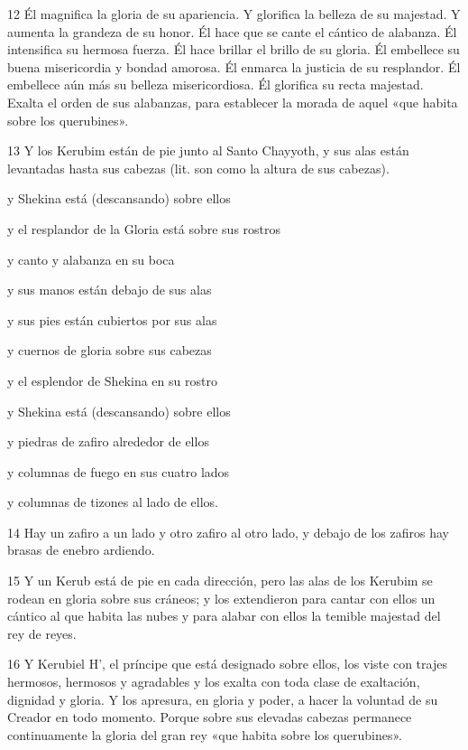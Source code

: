 \par 12 Él magnifica la gloria de su apariencia. Y glorifica la belleza de su majestad. Y aumenta la grandeza de su honor. Él hace que se cante el cántico de alabanza. Él intensifica su hermosa fuerza. Él hace brillar el brillo de su gloria. Él embellece su buena misericordia y bondad amorosa. Él enmarca la justicia de su resplandor. Él embellece aún más su belleza misericordiosa. Él glorifica su recta majestad. Exalta el orden de sus alabanzas, para establecer la morada de aquel «que habita sobre los querubines».

\par 13 Y los Kerubim están de pie junto al Santo Chayyoth, y sus alas están levantadas hasta sus cabezas (lit. son como la altura de sus cabezas).
\par y Shekina está (descansando) sobre ellos
\par y el resplandor de la Gloria está sobre sus rostros
\par y canto y alabanza en su boca
\par y sus manos están debajo de sus alas
\par y sus pies están cubiertos por sus alas
\par y cuernos de gloria sobre sus cabezas
\par y el esplendor de Shekina en su rostro
\par y Shekina está (descansando) sobre ellos
\par y piedras de zafiro alrededor de ellos
\par y columnas de fuego en sus cuatro lados
\par y columnas de tizones al lado de ellos.

\par 14 Hay un zafiro a un lado y otro zafiro al otro lado, y debajo de los zafiros hay brasas de enebro ardiendo.

\par 15 Y un Kerub está de pie en cada dirección, pero las alas de los Kerubim se rodean en gloria sobre sus cráneos; y los extendieron para cantar con ellos un cántico al que habita las nubes y para alabar con ellos la temible majestad del rey de reyes.

\par 16 Y Kerubiel H', el príncipe que está designado sobre ellos, los viste con trajes hermosos, hermosos y agradables y los exalta con toda clase de exaltación, dignidad y gloria. Y los apresura, en gloria y poder, a hacer la voluntad de su Creador en todo momento. Porque sobre sus elevadas cabezas permanece continuamente la gloria del gran rey «que habita sobre los querubines».

